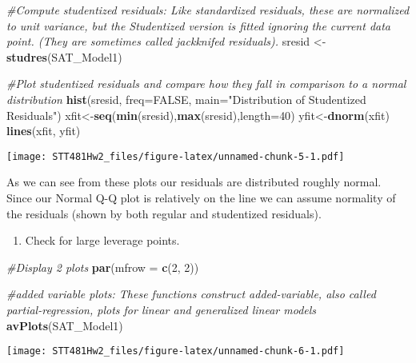\documentclass[]{article}
\newenvironment{Shaded}{\begin{snugshade}}{\end{snugshade}}
\newcommand{\KeywordTok}[1]{\textcolor[rgb]{0.13,0.29,0.53}{\textbf{#1}}}
\newcommand{\DataTypeTok}[1]{\textcolor[rgb]{0.13,0.29,0.53}{#1}}
\newcommand{\DecValTok}[1]{\textcolor[rgb]{0.00,0.00,0.81}{#1}}
\newcommand{\StringTok}[1]{\textcolor[rgb]{0.31,0.60,0.02}{#1}}
\newcommand{\CommentTok}[1]{\textcolor[rgb]{0.56,0.35,0.01}{\textit{#1}}}
\newcommand{\OtherTok}[1]{\textcolor[rgb]{0.56,0.35,0.01}{#1}}
\newcommand{\NormalTok}[1]{#1}
\providecommand{\tightlist}{%
  \setlength{\itemsep}{0pt}\setlength{\parskip}{0pt}}
\begin{document}
\begin{Shaded}
\begin{Highlighting}[]
\CommentTok{#Compute studentized residuals: Like standardized residuals, these are normalized to unit variance, but the Studentized version is fitted ignoring the current data point. (They are sometimes called jackknifed residuals).}
\NormalTok{sresid <-}\StringTok{ }\KeywordTok{studres}\NormalTok{(SAT_Model1)}

\CommentTok{#Plot studentized residuals and compare how they fall in comparison to a normal distribution}
\KeywordTok{hist}\NormalTok{(sresid, }\DataTypeTok{freq=}\OtherTok{FALSE}\NormalTok{,}
   \DataTypeTok{main=}\StringTok{"Distribution of Studentized Residuals"}\NormalTok{)}
\NormalTok{xfit<-}\KeywordTok{seq}\NormalTok{(}\KeywordTok{min}\NormalTok{(sresid),}\KeywordTok{max}\NormalTok{(sresid),}\DataTypeTok{length=}\DecValTok{40}\NormalTok{)}
\NormalTok{yfit<-}\KeywordTok{dnorm}\NormalTok{(xfit)}
\KeywordTok{lines}\NormalTok{(xfit, yfit)}
\end{Highlighting}
\end{Shaded}

\texttt{[image: STT481Hw2\_files/figure-latex/unnamed-chunk-5-1.pdf]}

As we can see from these plots our residuals are distributed roughly
normal. Since our Normal Q-Q plot is relatively on the line we can
assume normality of the residuals (shown by both regular and studentized
residuals).

\begin{enumerate}
\def\labelenumi{(\alph{enumi})}
\setcounter{enumi}{2}
\tightlist
\item
  Check for large leverage points.
\end{enumerate}

\begin{Shaded}
\begin{Highlighting}[]
\CommentTok{#Display 2 plots }
\KeywordTok{par}\NormalTok{(}\DataTypeTok{mfrow =} \KeywordTok{c}\NormalTok{(}\DecValTok{2}\NormalTok{, }\DecValTok{2}\NormalTok{))}

\CommentTok{#added variable plots: These functions construct added-variable, also called partial-regression, plots for linear and generalized linear models}
\KeywordTok{avPlots}\NormalTok{(SAT_Model1)}
\end{Highlighting}
\end{Shaded}

\texttt{[image: STT481Hw2\_files/figure-latex/unnamed-chunk-6-1.pdf]}
\end{document}
